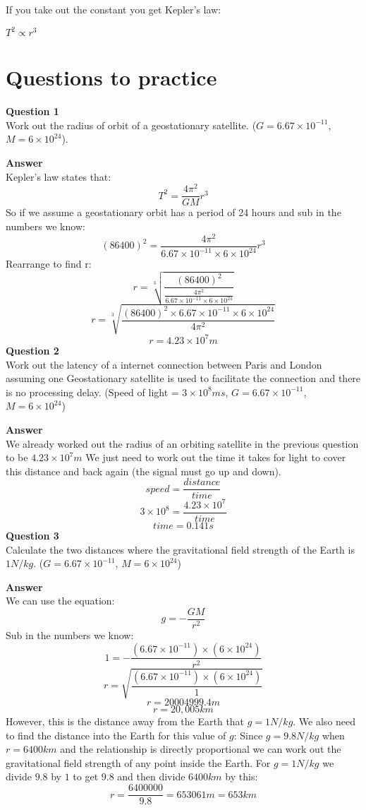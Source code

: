 \documentclass{article}
\begin{document}
If you take out the constant you get Kepler's law:

$T^2 \propto r^3$

\section*{Questions to practice}
\textbf{Question 1}\\
Work out the radius of orbit of a geostationary satellite.
($G = 6.67 \times 10^{-11}$, $M = 6 \times 10^{24}$).

\textbf{Answer}\\
Kepler's law states that:
\[
	T^2 = \frac{4 \pi ^2}{GM} r^3
\]
So if we assume a geostationary orbit has a period of 24 hours and sub in the
numbers we know:
\[
	(86400)^2 = \frac{
					4 \pi ^2
				}{
					6.67 \times 10^{-11} \times 6 \times 10^{24}
				} r^3
\]
Rearrange to find r:
\[
	r = \sqrt[3]{
			\frac{
				(86400)^2
			}{
				\frac{
					4 \pi ^2
				}{
					6.67 \times 10^{-11} \times 6 \times 10^{24}
				}
			}
		}
\]
\[
	r = \sqrt[3]{
			\frac{
				(86400)^2 \times 6.67 \times 10^{-11} \times 6 \times 10^{24}
			}{
				4 \pi ^2
			}
		}
\]
\[
	r = 4.23 \times 10^{7}m
\]
\textbf{Question 2}\\
Work out the latency of a internet connection between Paris and London
assuming one Geostationary satellite is used to facilitate the connection and
there is no processing delay. (Speed of light = 
$3 \times 10^8 ms$, $G = 6.67 \times 10^{-11}$, $M = 6 \times 10^{24}$)

\textbf{Answer}\\
We already worked out the radius of an orbiting satellite in the previous
question to be $4.23 \times 10^{7}m$ We just need to work out the time it takes
for light to cover this distance and back again (the signal must go up and
down).
\[
	speed = \frac{distance}{time}
\]
\[
	3 \times 10^8 = \frac{4.23 \times 10^{7}}{time}
\]
\[
	time = 0.141s
\]
\textbf{Question 3}\\
Calculate the two distances where the gravitational field strength of the Earth
is $1N/kg$. ($G = 6.67 \times 10^{-11}$, $M = 6 \times 10^{24}$)

\textbf{Answer}\\
We can use the equation:
\[
	g = -\frac{GM}{r^2}
\]
Sub in the numbers we know:
\[
	1 = -\frac{(6.67 \times 10^{-11}) \times (6 \times 10^{24})}{r^2}
\]
\[
	r = \sqrt{\frac{(6.67 \times 10^{-11}) \times (6 \times 10^{24})}{1}}
\]
\[
	r = 20004999.4m
\]
\[
	r = 20,005km
\]
However, this is the distance away from the Earth that $g = 1N/kg$. We also need
to find the distance into the Earth for this value of $g$:
Since $g = 9.8N/kg$ when $r = 6400km$ and the relationship is directly
proportional we can work out the gravitational field strength of any point
inside the Earth.
For $g = 1N/kg$ we divide $9.8$ by $1$ to get $9.8$ and then divide $6400km$ by
this:
\[
	r = \frac{6400000}{9.8} = 653061m = 653km
\]
\end{document}
